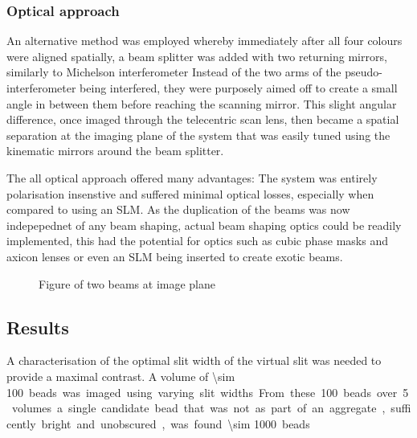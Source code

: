 \subsubsection{Optical approach}
An alternative method was employed whereby immediately after all four colours were aligned spatially, a beam splitter was added with two returning mirrors, similarly to Michelson interferometer
Instead of the two arms of the pseudo-interferometer being interfered, they were purposely aimed off to create a small angle in between them before reaching the scanning mirror.
This slight angular difference, once imaged through the telecentric scan lens, then became a spatial separation at the imaging plane of the system that was easily tuned using the kinematic mirrors around the beam splitter.

The all optical approach offered many advantages: The system was entirely polarisation insenstive and suffered minimal optical losses, especially when compared to using an SLM. As the duplication of the beams was now indepepednet of any beam shaping, actual beam shaping optics could be readily implemented, this had the potential for optics such as cubic phase masks and axicon lenses or even an SLM being inserted to create exotic beams.

\begin{figure}
  \caption{Figure of two beams at image plane}
  \label{}
\end{figure}

\subsection{Results}

A characterisation of the optimal slit width of the virtual slit was needed to provide a maximal contrast.
A volume of \SI{\sim 100} beads was imaged using varying slit widths.
From these 100 beads over 5 volumes a single candidate bead that was not as part of an aggregate, sufficently bright and unobscured, was found.
\SI{\sim 1000}%
beads

